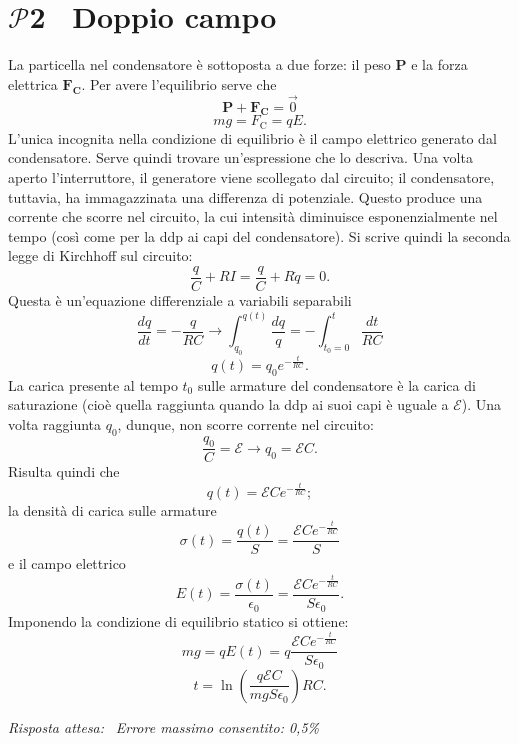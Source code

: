 \documentclass[a4paper,12pt]{article}
\newcommand{\problemtitle}[1]{
  \noindent
  \textbf{\Large #1}\hspace{0.5em}
  \raisebox{0.6ex}{\rule{\linewidth - \widthof{\textbf{\Large #1}} - 0.6em}{0.4pt}}%
}
\begin{document}
\section*{\problemtitle{$\mathcal{P}${\small{2}} \ Doppio campo}}
La particella nel condensatore è sottoposta a due forze: il peso $\mathbf{P}$ e la forza elettrica $\mathbf{F_{\text{C}}}$. Per avere l'equilibrio serve che 
\[
\mathbf{P} + \mathbf{F_{\text{C}}} = \vec{0} \tag{2.0}
\]
\[
mg = F_{\text{C}} = qE. \tag{2.1}
\]
L'unica incognita nella condizione di equilibrio è il campo elettrico generato dal condensatore. Serve quindi trovare un'espressione che lo descriva. Una volta aperto l'interruttore, il generatore viene scollegato dal circuito; il condensatore, tuttavia, ha immagazzinata una differenza di potenziale. Questo produce una corrente che scorre nel circuito, la cui intensità diminuisce esponenzialmente nel tempo (così come per la ddp ai capi del condensatore). Si scrive quindi la seconda legge di Kirchhoff sul circuito:
\[
\frac{q}{C} + RI = \frac{q}{C} + R\dot{q} = 0. \tag{2.2}
\]
Questa è un'equazione differenziale a variabili separabili
\[
\frac{dq}{dt} = -\frac{q}{RC} \rightarrow \int_{q_0}^{q(t)} \frac{dq}{q} = -\int_{t_0 = 0}^{t} \frac{dt}{RC} \tag{2.3}
\]
\[
q(t) = q_0e^{-\frac{t}{RC}}. \tag{2.4}
\]
La carica presente al tempo $t_0$ sulle armature del condensatore è la carica di saturazione (cioè quella raggiunta quando la ddp ai suoi capi è uguale a $\mathcal{E}$). Una volta raggiunta $q_0$, dunque, non scorre corrente nel circuito:
\[
\frac{q_0}{C} = \mathcal{E} \rightarrow q_0 = \mathcal{E}C. \tag{2.5}
\]
Risulta quindi che 
\[
q(t) = \mathcal{E}Ce^{-\frac{t}{RC}}; \tag{2.6}
\]
la densità di carica sulle armature
\[
\sigma(t) = \frac{q(t)}{S} = \frac{\mathcal{E}Ce^{-\frac{t}{RC}}}{S} \tag{2.7}
\]
e il campo elettrico
\[
E(t) = \frac{\sigma(t)}{\epsilon_0} = \frac{\mathcal{E}Ce^{-\frac{t}{RC}}}{S\epsilon_0}. \tag{2.8}
\]
Imponendo la condizione di equilibrio statico si ottiene:
\[
mg = qE(t) = q\frac{\mathcal{E}Ce^{-\frac{t}{RC}}}{S\epsilon_0} \tag{2.9}
\]
\[
t = \ln{\left(\frac{q\mathcal{E}C}{mgS\epsilon_0}\right)}RC. \tag{2.10}
\]

\textit{Risposta attesa:}  \, \textit{Errore massimo consentito: 0,5\%}
\end{document}
